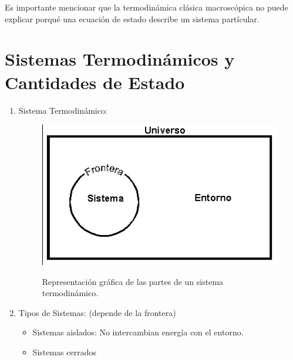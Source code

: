 Es importante mencionar que la termodinámica clásica macroscópica no puede explicar porqué una ecuación de estado describe un sistema partícular.



\section{Sistemas Termodinámicos y Cantidades de Estado}

\begin{enumerate}
	\item Sistema Termodinámico:
	\begin{figure}[H]
		\centering
		\includegraphics[scale=0.3]{./img/thermodynamicSystem.png}
		\label{thermodynamicSystem}
		\caption{Representación gráfica de las partes de un sistema termodinámico.}
	\end{figure}
	
	\item Tipos de Sistemas: (depende de la frontera)
	\begin{itemize}
		\item Sistemas aislados: No intercambian energía con el entorno.
		\item Sistemas cerrados
	\end{itemize}
\end{enumerate}






